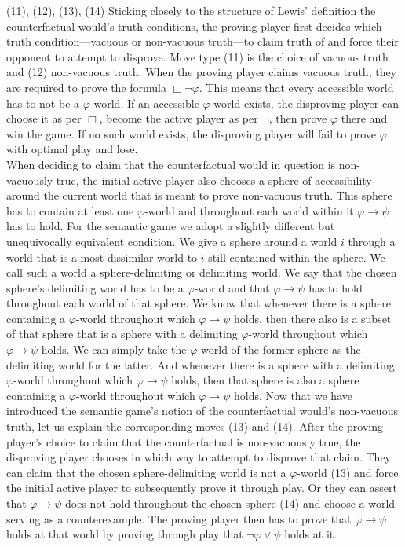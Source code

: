 \documentclass[a4paper,american,10pt]{paper}
\theoremstyle{definition}\newtheorem{definition}{Definition}
\begin{document}
\indent (11), (12), (13), (14) Sticking closely to the structure of Lewis' definition the counterfactual would's truth conditions, the proving player first decides which truth condition---vacuous or non-vacuous truth---to claim truth of and force their opponent to attempt to disprove. Move type (11) is the choice of vacuous truth and (12) non-vacuous truth. When the proving player claims vacuous truth, they are required to prove the formula $\Box\neg\varphi$. This means that every accessible world has to not be a $\varphi$-world. If an accessible $\varphi$-world exists, the disproving player can choose it as per $\Box$, become the active player as per $\neg$, then prove $\varphi$ there and win the game. If no such world exists, the disproving player will fail to prove $\varphi$ with optimal play and lose.\\
\indent When deciding to claim that the counterfactual would in question is non-vacuously true, the initial active player also chooses a sphere of accessibility around the current world that is meant to prove non-vacuous truth. This sphere has to contain at least one $\varphi$-world and throughout each world within it $\varphi\rightarrow\psi$ has to hold. For the semantic game we adopt a slightly different but unequivocally equivalent condition. We give a sphere around a world $i$ through a world that is a most dissimilar world to $i$ still contained within the sphere. We call such a world a sphere-delimiting or delimiting world. We say that the chosen sphere's delimiting world has to be a $\varphi$-world and that $\varphi\rightarrow\psi$ has to hold throughout each world of that sphere. We know that whenever there is a sphere containing a $\varphi$-world throughout which $\varphi\rightarrow\psi$ holds, then there also is a subset of that sphere that is a sphere with a delimiting $\varphi$-world throughout which $\varphi\rightarrow\psi$ holds. We can simply take the $\varphi$-world of the former sphere as the delimiting world for the latter. And whenever there is a sphere with a delimiting $\varphi$-world throughout which $\varphi\rightarrow\psi$ holds, then that sphere is also a sphere containing a $\varphi$-world throughout which $\varphi\rightarrow\psi$ holds. Now that we have introduced the semantic game's notion of the counterfactual would's non-vacuous truth, let us explain the corresponding moves (13) and (14). After the proving player's choice to claim that the counterfactual is non-vacuously true, the disproving player chooses in which way to attempt to disprove that claim. They can claim that the chosen sphere-delimiting world is not a $\varphi$-world (13) and force the initial active player to subsequently prove it through play. Or they can assert that $\varphi\rightarrow\psi$ does not hold throughout the chosen sphere (14) and choose a world serving as a counterexample. The proving player then has to prove that $\varphi\rightarrow\psi$ holds at that world by proving through play that $\neg\varphi\vee\psi$ holds at it.\\
\end{document}

